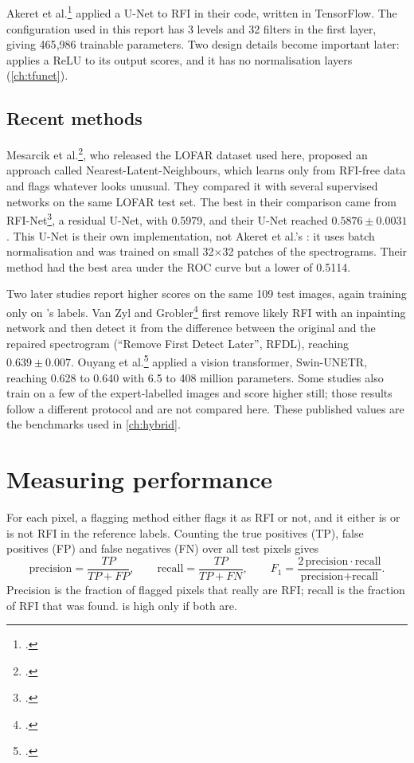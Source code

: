\subsection{\tfunet{}}
Akeret et al.\footcite{akeret2017} applied a U-Net to RFI in their \tfunet{}
code, written in TensorFlow. The configuration used in this report has 3
levels and 32 filters in the first layer, giving 465{,}986 trainable
parameters. Two design details become important later: \tfunet{} applies a ReLU
to its output scores, and it has no normalisation layers
(\cref{ch:tfunet}).

\subsection{Recent methods}
Mesarcik et al.\footcite{mesarcik2022}, who released the LOFAR dataset used here,
proposed an approach called Nearest-Latent-Neighbours, which learns only from
RFI-free data and flags whatever looks unusual. They compared it with several
supervised networks on the same LOFAR test set. The best \Fone{} in their
comparison came from RFI-Net\footcite{yang2020rfinet}, a residual U-Net, with
0.5979, and their U-Net reached $0.5876 \pm 0.0031$. This U-Net is their own
implementation, not Akeret et al.'s \tfunet{}: it uses batch normalisation and
was trained on small 32$\times$32 patches of the spectrograms. Their method had the best
area under the ROC curve but a lower \Fone{} of 0.5114.

Two later studies report higher scores on the same 109 test images, again
training only on \aoflagger{}'s labels. Van Zyl and Grobler\footcite{vanzyl2024rfdl}
first remove likely RFI with an inpainting network and then detect it from the
difference between the original and the repaired spectrogram (``Remove First
Detect Later'', RFDL), reaching $0.639 \pm 0.007$. Ouyang et
al.\footcite{ouyang2024swin} applied a vision transformer, Swin-UNETR, reaching
0.628 to 0.640 with 6.5 to 408 million parameters. Some studies also train on a
few of the expert-labelled images and score higher still; those results follow a
different protocol and are not compared here. These published values are the
benchmarks used in \cref{ch:hybrid}.

\section{Measuring performance}
\label{sec:metrics}
For each pixel, a flagging method either flags it as RFI or not, and it either
is or is not RFI in the reference labels. Counting the true positives (TP),
false positives (FP) and false negatives (FN) over all test pixels gives
\begin{equation}
  \text{precision} = \frac{TP}{TP + FP}, \qquad
  \text{recall} = \frac{TP}{TP + FN}, \qquad
  F_1 = \frac{2\,\text{precision}\cdot\text{recall}}{\text{precision} + \text{recall}}.
\end{equation}
Precision is the fraction of flagged pixels that really are RFI; recall is the
fraction of RFI that was found. \Fone{} is high only if both are.

